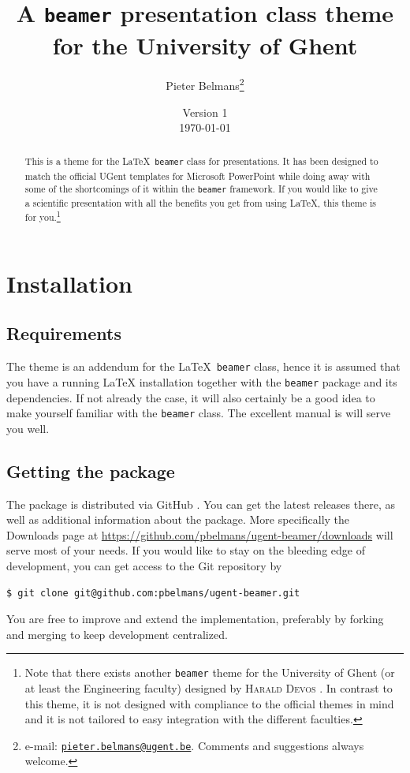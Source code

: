 \documentclass[a4paper,10pt]{article}
\title{A \texttt{beamer} presentation class theme for the University of Ghent}
\author{Pieter Belmans\thanks{e-mail: \href{mailto:pieter.belmans@ugent.be}{\nolinkurl{pieter.belmans@ugent.be}}. Comments and suggestions always welcome.}}
\date{Version 1 \\ \today}
\begin{document}
\maketitle

\begin{abstract}
  This is a theme for the \LaTeX\ \texttt{beamer} class for presentations. It has been designed to match the official UGent templates for Microsoft PowerPoint\textsuperscript{\textregistered} while doing away with some of the shortcomings of it within the \texttt{beamer} framework. If you would like to give a scientific presentation with all the benefits you get from using \LaTeX, this theme is for you.\footnote{Note that there exists another \texttt{beamer} theme for the University of Ghent (or at least the Engineering faculty) designed by \textsc{Harald Devos} \cite{devos-theme}. In contrast to this theme, it is not designed with compliance to the official themes in mind and it is not tailored to easy integration with the different faculties.}
\end{abstract}


\section{Installation}

\subsection{Requirements}
  The theme is an addendum for the \LaTeX\ \texttt{beamer} class, hence it is assumed that you have a running \LaTeX{} installation together with the \texttt{beamer} package \cite{beamer-repository} and its dependencies. If not already the case, it will also certainly be a good idea to make yourself familiar with the \texttt{beamer} class. The excellent manual \cite{beamer-manual} is will serve you well.

\subsection{Getting the package}

The package is distributed via GitHub \cite{ugent-beamer}. You can get the latest releases there, as well as additional information about the package. More specifically the Downloads page at \url{https://github.com/pbelmans/ugent-beamer/downloads} will serve most of your needs. If you would like to stay on the bleeding edge of development, you can get access to the Git repository by
\begin{lstlisting}
$ git clone git@github.com:pbelmans/ugent-beamer.git
\end{lstlisting}
You are free to improve and extend the implementation, preferably by forking and merging to keep development centralized.
\end{document}
